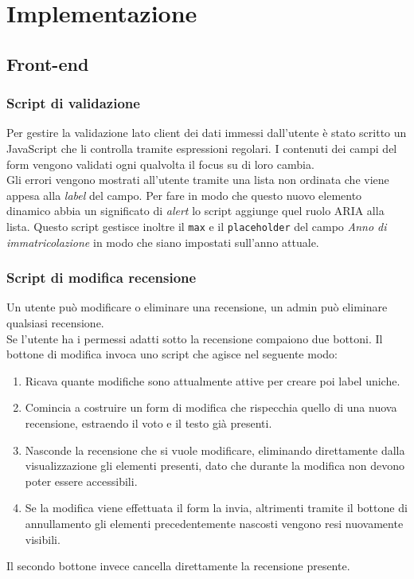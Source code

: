 \section{Implementazione}

\subsection{Front-end}

\subsubsection{Script di validazione}
Per gestire la validazione lato client dei dati immessi dall'utente è stato scritto un JavaScript che li controlla tramite espressioni regolari. I contenuti dei campi del form vengono validati ogni qualvolta il focus su di loro cambia.\\
Gli errori vengono mostrati all'utente tramite una lista non ordinata che viene appesa alla \textit{label} del campo. Per fare in modo che questo nuovo elemento dinamico abbia un significato di \textit{alert} lo script aggiunge quel ruolo ARIA alla lista.
Questo script gestisce inoltre il \texttt{max} e il \texttt{placeholder} del campo \textit{Anno di immatricolazione} in modo che siano impostati sull'anno attuale.

\subsubsection{Script di modifica recensione}
Un utente può modificare o eliminare una recensione, un admin può eliminare qualsiasi recensione.\\
Se l'utente ha i permessi adatti sotto la recensione compaiono due bottoni. Il bottone di modifica invoca uno script che agisce nel seguente modo:
\begin{enumerate}
    \item Ricava quante modifiche sono attualmente attive per creare poi label uniche.
    \item Comincia a costruire un form di modifica che rispecchia quello di una nuova recensione, estraendo il voto e il testo già presenti.
    \item Nasconde la recensione che si vuole modificare, eliminando direttamente dalla visualizzazione gli elementi presenti, dato che durante la modifica non devono poter essere accessibili.
    \item Se la modifica viene effettuata il form la invia, altrimenti tramite il bottone di annullamento gli elementi precedentemente nascosti vengono resi nuovamente visibili.
\end{enumerate}
Il secondo bottone invece cancella direttamente la recensione presente.

